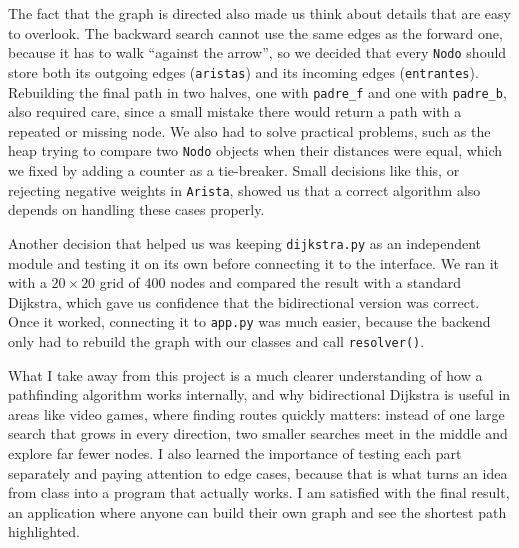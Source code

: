 \documentclass[11pt,letterpaper]{article}
\newcommand{\code}[1]{\texttt{#1}}
\begin{document}
The fact that the graph is directed also made us think about details that are easy to overlook. The backward search cannot use the same edges as the forward one, because it has to walk ``against the arrow'', so we decided that every \code{Nodo} should store both its outgoing edges (\code{aristas}) and its incoming edges (\code{entrantes}). Rebuilding the final path in two halves, one with \code{padre\_f} and one with \code{padre\_b}, also required care, since a small mistake there would return a path with a repeated or missing node. We also had to solve practical problems, such as the heap trying to compare two \code{Nodo} objects when their distances were equal, which we fixed by adding a counter as a tie-breaker. Small decisions like this, or rejecting negative weights in \code{Arista}, showed us that a correct algorithm also depends on handling these cases properly.

Another decision that helped us was keeping \code{dijkstra.py} as an independent module and testing it on its own before connecting it to the interface. We ran it with a $20\times20$ grid of 400 nodes and compared the result with a standard Dijkstra, which gave us confidence that the bidirectional version was correct. Once it worked, connecting it to \code{app.py} was much easier, because the backend only had to rebuild the graph with our classes and call \code{resolver()}.

What I take away from this project is a much clearer understanding of how a pathfinding algorithm works internally, and why bidirectional Dijkstra is useful in areas like video games, where finding routes quickly matters: instead of one large search that grows in every direction, two smaller searches meet in the middle and explore far fewer nodes. I also learned the importance of testing each part separately and paying attention to edge cases, because that is what turns an idea from class into a program that actually works. I am satisfied with the final result, an application where anyone can build their own graph and see the shortest path highlighted.
\end{document}
